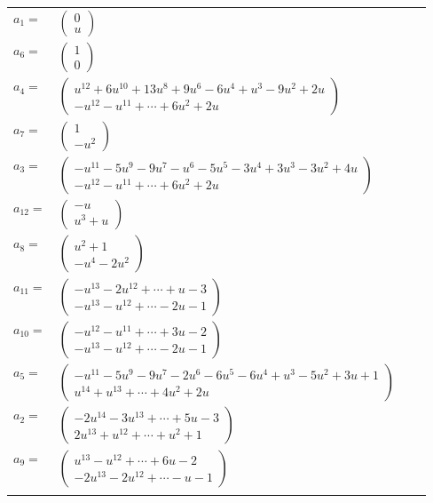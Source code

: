 \documentclass[1p]{elsarticle_modified}
\theoremstyle{definition}
\begin{document}
\begin{tabular}{m{7pt} m{180pt} m{7pt} m{180pt} }
\flushright $a_{1}=$&$\begin{pmatrix}0\\u\end{pmatrix}$ \\
\flushright $a_{6}=$&$\begin{pmatrix}1\\0\end{pmatrix}$ \\
\flushright $a_{4}=$&$\begin{pmatrix}u^{12}+6 u^{10}+13 u^8+9 u^6-6 u^4+u^3-9 u^2+2 u\\- u^{12}- u^{11}+\cdots+6 u^2+2 u\end{pmatrix}$ \\
\flushright $a_{7}=$&$\begin{pmatrix}1\\- u^2\end{pmatrix}$ \\
\flushright $a_{3}=$&$\begin{pmatrix}- u^{11}-5 u^9-9 u^7- u^6-5 u^5-3 u^4+3 u^3-3 u^2+4 u\\- u^{12}- u^{11}+\cdots+6 u^2+2 u\end{pmatrix}$ \\
\flushright $a_{12}=$&$\begin{pmatrix}- u\\u^3+u\end{pmatrix}$ \\
\flushright $a_{8}=$&$\begin{pmatrix}u^2+1\\- u^4-2 u^2\end{pmatrix}$ \\
\flushright $a_{11}=$&$\begin{pmatrix}- u^{13}-2 u^{12}+\cdots+u-3\\- u^{13}- u^{12}+\cdots-2 u-1\end{pmatrix}$ \\
\flushright $a_{10}=$&$\begin{pmatrix}- u^{12}- u^{11}+\cdots+3 u-2\\- u^{13}- u^{12}+\cdots-2 u-1\end{pmatrix}$ \\
\flushright $a_{5}=$&$\begin{pmatrix}- u^{11}-5 u^9-9 u^7-2 u^6-6 u^5-6 u^4+u^3-5 u^2+3 u+1\\u^{14}+u^{13}+\cdots+4 u^2+2 u\end{pmatrix}$ \\
\flushright $a_{2}=$&$\begin{pmatrix}-2 u^{14}-3 u^{13}+\cdots+5 u-3\\2 u^{13}+u^{12}+\cdots+u^2+1\end{pmatrix}$ \\
\flushright $a_{9}=$&$\begin{pmatrix}u^{13}- u^{12}+\cdots+6 u-2\\-2 u^{13}-2 u^{12}+\cdots- u-1\end{pmatrix}$\\&\end{tabular}
\end{document}
